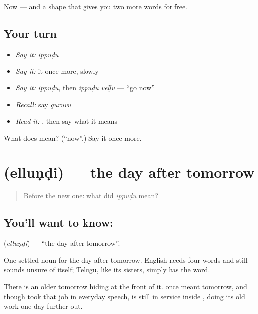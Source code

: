 \begin{grammarlens}[title={What you've built}]
Now — and a shape that gives you two more words for free.
\end{grammarlens}

\subsection*{Your turn}
\begin{itemize}
\raggedright
  \item \emph{Say it:} \emph{ippuḍu}
  \item \emph{Say it:} it once more, slowly
  \item \emph{Say it:} \emph{ippuḍu}, then \emph{ippuḍu veḷḷu} — \textquotedblleft{}go now\textquotedblright{}
  \item \emph{Recall:} say \emph{guruvu}
  \item \emph{Read it:} \textbf{}, then say what it means
\end{itemize}

\begin{tcolorbox}[breakable,colback=teal!4,colframe=teal!35!black,title={Before you move on}]
What does  mean? (\textquotedblleft{}now\textquotedblright{}.) Say it once more.
\end{tcolorbox}
\section[\texorpdfstring{\te{ఎల్లుండి} (elluṇḍi)}{ఎల్లుండి (elluṇḍi)}]{ (elluṇḍi) — the day after tomorrow}

\label{lesson:TE-C50-day-after}



\begin{quote}
Before the new one: what did \emph{ippuḍu} mean?
\end{quote}

\subsection*{You'll want to know: }
\textbf{} (\emph{elluṇḍi}) — \textquotedblleft{}the day after tomorrow\textquotedblright{}.

One settled noun for the day after tomorrow. English needs four words and still sounds unsure of itself; Telugu, like its sisters, simply has the word.

There is an older tomorrow hiding at the front of it.  once meant tomorrow, and though  took that job in everyday speech,  is still in service inside , doing its old work one day further out.

